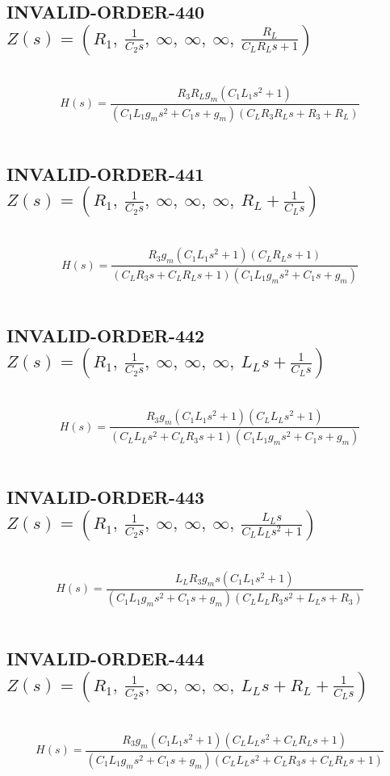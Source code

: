 \documentclass{article}
\begin{document}
\subsection{INVALID-ORDER-440 $Z(s) = \left( R_{1}, \  \frac{1}{C_{2} s}, \  \infty, \  \infty, \  \infty, \  \frac{R_{L}}{C_{L} R_{L} s + 1}\right)$ } \ 
\textbf{\[H(s) = \frac{R_{3} R_{L} g_{m} \left(C_{1} L_{1} s^{2} + 1\right)}{\left(C_{1} L_{1} g_{m} s^{2} + C_{1} s + g_{m}\right) \left(C_{L} R_{3} R_{L} s + R_{3} + R_{L}\right)}\] } \ 
\subsection{INVALID-ORDER-441 $Z(s) = \left( R_{1}, \  \frac{1}{C_{2} s}, \  \infty, \  \infty, \  \infty, \  R_{L} + \frac{1}{C_{L} s}\right)$ } \ 
\textbf{\[H(s) = \frac{R_{3} g_{m} \left(C_{1} L_{1} s^{2} + 1\right) \left(C_{L} R_{L} s + 1\right)}{\left(C_{L} R_{3} s + C_{L} R_{L} s + 1\right) \left(C_{1} L_{1} g_{m} s^{2} + C_{1} s + g_{m}\right)}\] } \ 
\subsection{INVALID-ORDER-442 $Z(s) = \left( R_{1}, \  \frac{1}{C_{2} s}, \  \infty, \  \infty, \  \infty, \  L_{L} s + \frac{1}{C_{L} s}\right)$ } \ 
\textbf{\[H(s) = \frac{R_{3} g_{m} \left(C_{1} L_{1} s^{2} + 1\right) \left(C_{L} L_{L} s^{2} + 1\right)}{\left(C_{L} L_{L} s^{2} + C_{L} R_{3} s + 1\right) \left(C_{1} L_{1} g_{m} s^{2} + C_{1} s + g_{m}\right)}\] } \ 
\subsection{INVALID-ORDER-443 $Z(s) = \left( R_{1}, \  \frac{1}{C_{2} s}, \  \infty, \  \infty, \  \infty, \  \frac{L_{L} s}{C_{L} L_{L} s^{2} + 1}\right)$ } \ 
\textbf{\[H(s) = \frac{L_{L} R_{3} g_{m} s \left(C_{1} L_{1} s^{2} + 1\right)}{\left(C_{1} L_{1} g_{m} s^{2} + C_{1} s + g_{m}\right) \left(C_{L} L_{L} R_{3} s^{2} + L_{L} s + R_{3}\right)}\] } \ 
\subsection{INVALID-ORDER-444 $Z(s) = \left( R_{1}, \  \frac{1}{C_{2} s}, \  \infty, \  \infty, \  \infty, \  L_{L} s + R_{L} + \frac{1}{C_{L} s}\right)$ } \ 
\textbf{\[H(s) = \frac{R_{3} g_{m} \left(C_{1} L_{1} s^{2} + 1\right) \left(C_{L} L_{L} s^{2} + C_{L} R_{L} s + 1\right)}{\left(C_{1} L_{1} g_{m} s^{2} + C_{1} s + g_{m}\right) \left(C_{L} L_{L} s^{2} + C_{L} R_{3} s + C_{L} R_{L} s + 1\right)}\] } \ 
\end{document}
